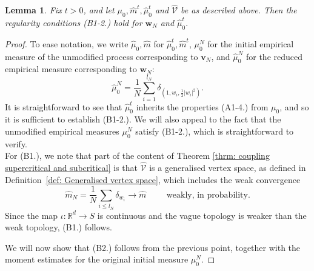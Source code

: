 \documentclass[11pt, notitlepage]{article}
\newtheorem{lem}[thm]{Lemma}
\begin{document}
\begin{lem}\label{lemma: conditions B1-3 for duality} Fix $t>0$, and let $\mu_0, \widehat{m}^t, \widehat{\mu}^t_0$ and $\widehat{\mathcal{V}}$ be as described above. Then the regularity conditions (B1-2.) hold for $\mathbf{w}_N$ and $\widehat{\mu}^t_0.$ \end{lem} \begin{proof} To ease notation, we write $\widehat{\mu}_0, \widehat{m}$ for $\widehat{\mu}^t_0, \widehat{m}^t$, $\mu^N_0$ for the initial empirical measure of the unmodified process corresponding to $\mathbf{v}_N$, and $\widehat{\mu}^N_0$ for the reduced empirical measure corresponding to $\mathbf{w}_N$: \begin{equation} \widehat{\mu}^N_0 =\frac{1}{N}\sum_{i=1}^{l_N} \delta_{(1,w_i, \frac{1}{2}|w_i|^2)}.\end{equation} It is straightforward to see that $\widehat{\mu}^t_0$ inherits the properties (A1-4.) from $\mu_0$, and so it is sufficient to establish (B1-2.). We will also appeal to the fact that the unmodified empirical measures $\mu^N_0$ satisfy (B1-2.), which is straightforward to verify. \medskip \\ For (B1.), we note that part of the content of Theorem \ref{thrm: coupling supercritical and subcritical} is that $\widehat{\mathcal{V}}$ is a generalised vertex space, as defined in Definition~\ref{def: Generalised vertex space}, which includes the weak convergence
\begin{equation}
    \widehat{m}_N=\frac{1}{N}\sum_{i\le l_N} \delta_{w_i} \rightarrow \widehat{m} \hspace{1cm}\text{weakly, in probability}.
\end{equation} Since the map $\iota: \mathbb{R}^d\rightarrow S$ is continuous and the vague topology is weaker than the weak topology, (B1.) follows.

We will now show that (B2.) follows from the previous point, together with the moment estimates for the original initial measure $\mu^N_0$. 


\end{proof}
\end{document}

